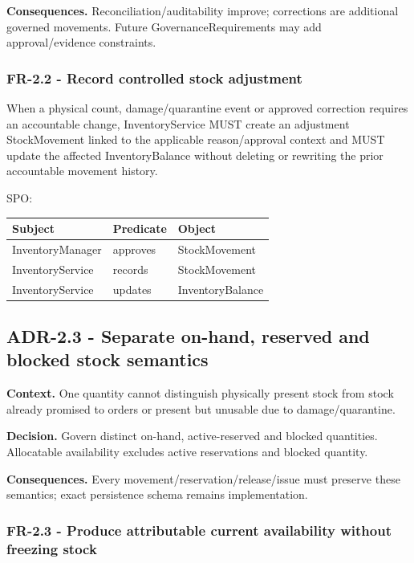 \documentclass[
  10pt,
]{article}
\begin{document}
\textbf{Consequences.} Reconciliation/auditability improve; corrections
are additional governed movements. Future GovernanceRequirements may add
approval/evidence constraints.

\subsubsection{FR-2.2 - Record controlled stock
adjustment}\label{fr-22---record-controlled-stock-adjustment}

When a physical count, damage/quarantine event or approved correction
requires an accountable change, InventoryService MUST create an
adjustment StockMovement linked to the applicable reason/approval
context and MUST update the affected InventoryBalance without deleting
or rewriting the prior accountable movement history.

SPO:

\begin{longtable}[]{@{}lll@{}}
\toprule\noalign{}
Subject & Predicate & Object \\
\midrule\noalign{}
\endhead
\bottomrule\noalign{}
\endlastfoot
InventoryManager & approves & StockMovement \\
InventoryService & records & StockMovement \\
InventoryService & updates & InventoryBalance \\
\end{longtable}

\subsection{ADR-2.3 - Separate on-hand, reserved and blocked stock
semantics}\label{adr-23---separate-on-hand-reserved-and-blocked-stock-semantics}

\textbf{Context.} One quantity cannot distinguish physically present
stock from stock already promised to orders or present but unusable due
to damage/quarantine.

\textbf{Decision.} Govern distinct on-hand, active-reserved and blocked
quantities. Allocatable availability excludes active reservations and
blocked quantity.

\textbf{Consequences.} Every movement/reservation/release/issue must
preserve these semantics; exact persistence schema remains
implementation.

\subsubsection{FR-2.3 - Produce attributable current availability
without freezing
stock}\label{fr-23---produce-attributable-current-availability-without-freezing-stock}
\end{document}
